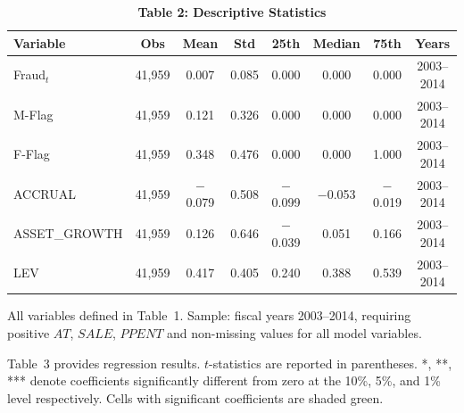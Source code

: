 \documentclass[12pt]{article}
\begin{document}

\begin{table}[h!]
\centering
\caption*{\textbf{Table 2: Descriptive Statistics}}
\begin{threeparttable}
\begin{tabular}{lccccccc}
\toprule
\textbf{Variable} & \textbf{Obs} & \textbf{Mean} & \textbf{Std} &
  \textbf{25th} & \textbf{Median} & \textbf{75th} & \textbf{Years} \\
\midrule
Fraud$_t$    & 41,959 & 0.007 & 0.085 & 0.000 & 0.000 & 0.000 & 2003--2014 \\
M-Flag       & 41,959 & 0.121 & 0.326 & 0.000 & 0.000 & 0.000 & 2003--2014 \\
F-Flag       & 41,959 & 0.348 & 0.476 & 0.000 & 0.000 & 1.000 & 2003--2014 \\
ACCRUAL      & 41,959 & $-$0.079 & 0.508 & $-$0.099 & $-$0.053 & $-$0.019 & 2003--2014 \\
ASSET\_GROWTH & 41,959 & 0.126 & 0.646 & $-$0.039 & 0.051 & 0.166 & 2003--2014 \\
LEV          & 41,959 & 0.417 & 0.405 & 0.240 & 0.388 & 0.539 & 2003--2014 \\
\bottomrule
\end{tabular}
\begin{tablenotes}
\small\item
All variables defined in Table~1. Sample: fiscal years 2003--2014, requiring
positive $AT$, $SALE$, $PPENT$ and non-missing values for all model variables.
\end{tablenotes}
\end{threeparttable}
\end{table}


Table~3 provides regression results. $t$-statistics are reported in parentheses.
*, **, *** denote coefficients significantly different from zero at the 10\%, 5\%,
and 1\% level respectively. Cells with significant coefficients are shaded green.
\end{document}
